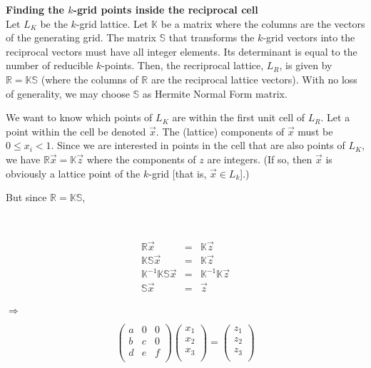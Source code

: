 \documentclass[11pt]{article}
\begin{document}
\noindent \textbf{Finding the $k$-grid points inside the reciprocal
  cell}\\

\vspace{0.1cm}
Let $L_K$ be the $k$-grid lattice. Let $\mathbb{K}$ be a matrix where the columns are the vectors of the
generating grid. The matrix $\mathbb{S}$ that transforms the $k$-grid
vectors into the reciprocal vectors must have all integer
elements. Its determinant is equal to the number of reducible
$k$-points.  Then, the recriprocal lattice, $L_R$, is given by
$\mathbb{R=KS}$ (where the columns of $\mathbb{R}$ are the reciprocal
lattice vectors).
 With no loss of generality, we may choose $\mathbb{S}$ as Hermite Normal
 Form matrix.

 
We want to know which points of $L_K$ are within the first unit cell of
$L_R$. Let a point within the cell be denoted $\vec x$. The (lattice) components
of $\vec x$ must be $0\leq x_i<1$. Since we are interested in points
in the cell that are also points of $L_K$, we have
$\mathbb{R}\vec x = \mathbb{K}\vec z$ where the components of $z$
are integers. (If so, then $\vec x$ is obviously a lattice point of the
$k$-grid [that is, $\vec x \in L_k$].)

But since $\mathbb{R=KS}$,\\
\parbox{2cm}{\ }
\parbox{5cm}{
\begin{eqnarray*}
\mathbb{R}\vec x& = & \mathbb{K}\vec z\\
\mathbb{KS}\vec x& = &\mathbb{K}\vec z\\
\mathbb{K}^{-1}\mathbb{KS}\vec x& = &\mathbb{K}^{-1}\mathbb{K}\vec z\\
\mathbb{S}\vec x& = &\vec z\\
\end{eqnarray*}
}$\Rightarrow$
\parbox{5cm}{\[
\left(\begin{array}{ccc}
a&0&0\\
b&c&0\\
d&e&f\\
\end{array}\right)
\left(\begin{array}{c}
x_1\\
x_2\\
x_3\\
\end{array}\right)
=
\left(\begin{array}{c}
z_1\\
z_2\\
z_3\\ 
\end{array}\right)\]}
\end{document}
